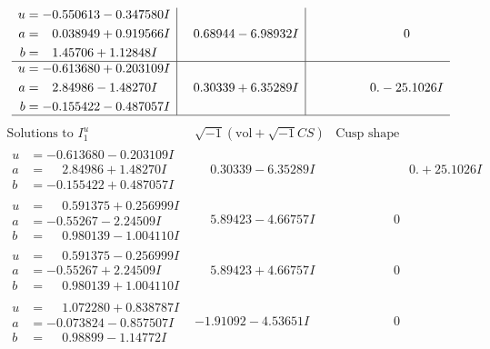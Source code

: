 \documentclass[1p]{elsarticle_modified}
\theoremstyle{definition}
\newcommand{\I}{\sqrt{-1}}
\begin{document}
$$\begin{array}{c|c|c}
\begin{aligned}
u &= -0.550613 - 0.347580 I \\
a &= \phantom{-}0.038949 + 0.919566 I \\
b &= \phantom{-}1.45706 + 1.12848 I\end{aligned}
 & \phantom{-}0.68944 - 6.98932 I & \phantom{-0.000000 } 0 \\ \hline\begin{aligned}
u &= -0.613680 + 0.203109 I \\
a &= \phantom{-}2.84986 - 1.48270 I \\
b &= -0.155422 - 0.487057 I\end{aligned}
 & \phantom{-}0.30339 + 6.35289 I & \phantom{-0.000000 } 0. - 25.1026 I\\
 \hline 
 \end{array}$$\newpage$$\begin{array}{c|c|c}  
\text{Solutions to }I^u_{1}& \I (\text{vol} + \sqrt{-1}CS) & \text{Cusp shape}\\
 \hline 
\begin{aligned}
u &= -0.613680 - 0.203109 I \\
a &= \phantom{-}2.84986 + 1.48270 I \\
b &= -0.155422 + 0.487057 I\end{aligned}
 & \phantom{-}0.30339 - 6.35289 I & \phantom{-0.000000 -}0. + 25.1026 I \\ \hline\begin{aligned}
u &= \phantom{-}0.591375 + 0.256999 I \\
a &= -0.55267 - 2.24509 I \\
b &= \phantom{-}0.980139 - 1.004110 I\end{aligned}
 & \phantom{-}5.89423 - 4.66757 I & \phantom{-0.000000 } 0 \\ \hline\begin{aligned}
u &= \phantom{-}0.591375 - 0.256999 I \\
a &= -0.55267 + 2.24509 I \\
b &= \phantom{-}0.980139 + 1.004110 I\end{aligned}
 & \phantom{-}5.89423 + 4.66757 I & \phantom{-0.000000 } 0 \\ \hline\begin{aligned}
u &= \phantom{-}1.072280 + 0.838787 I \\
a &= -0.073824 - 0.857507 I \\
b &= \phantom{-}0.98899 - 1.14772 I\end{aligned}
 & -1.91092 - 4.53651 I & \phantom{-0.000000 } 0 \\ \hline\begin{aligned}

\end{aligned}
\end{array}$$
\end{document}
